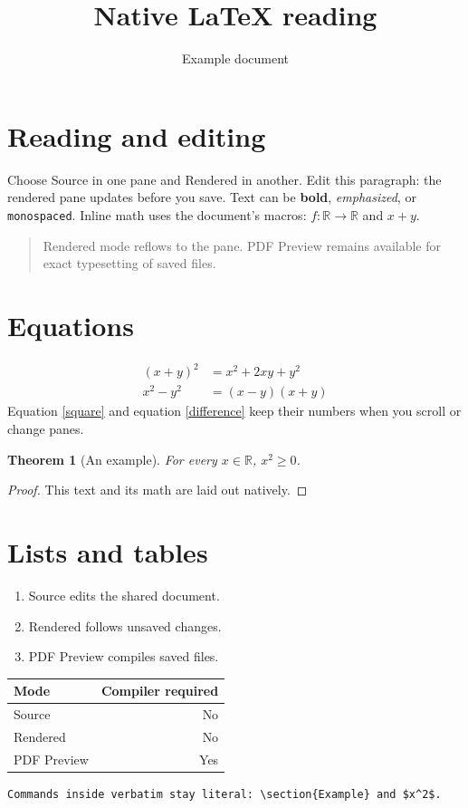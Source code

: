 \documentclass{article}
\title{Native LaTeX reading}
\author{Example document}
\date{}
\newcommand{\R}{\mathbb{R}}
\newcommand{\pair}[2][x]{#1 + #2}
\newtheorem{theorem}{Theorem}
\begin{document}
\maketitle

\section{Reading and editing}
Choose Source in one pane and Rendered in another. Edit this paragraph:
the rendered pane updates before you save. Text can be \textbf{bold},
\emph{emphasized}, or \texttt{monospaced}. Inline math uses the document's
macros: $f : \R \to \R$ and $\pair{y}$.

\begin{quote}
Rendered mode reflows to the pane. PDF Preview remains available for exact
typesetting of saved files.
\end{quote}

\section{Equations}
\begin{align}
  (x+y)^2 &= x^2 + 2xy + y^2 \label{square} \\
  x^2-y^2 &= (x-y)(x+y) \label{difference}
\end{align}
Equation \eqref{square} and equation \eqref{difference} keep their numbers
when you scroll or change panes.

\begin{theorem}[An example]
For every $x \in \R$, $x^2 \geq 0$.
\end{theorem}
\begin{proof}
This text and its math are laid out natively.
\end{proof}

\section{Lists and tables}
\begin{enumerate}
  \item Source edits the shared document.
  \item Rendered follows unsaved changes.
  \item PDF Preview compiles saved files.
\end{enumerate}

\begin{tabular}{lr}
  Mode & Compiler required \\ \hline
  Source & No \\
  Rendered & No \\
  PDF Preview & Yes \\
\end{tabular}

\begin{verbatim}
Commands inside verbatim stay literal: \section{Example} and $x^2$.
\end{verbatim}
\end{document}
